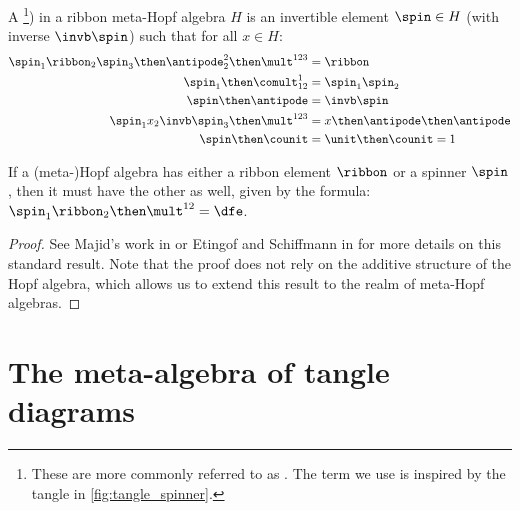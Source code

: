 \begin{definition}[spinner]
        A \footnote{%
                These are more commonly referred to as . The term we use is inspired by
                the tangle in \cref{fig:tangle_spinner}.
        }) in a ribbon meta-Hopf algebra $H$ is an invertible element
        $\spin\in H$ (with inverse $\invb\spin$) such that for all $x\in H$:
        \begin{align}
                \label{eq:spinner_ribbon}
                \spin_1\ribbon_2\spin_3 \then \antipode^2_2 \then \mult^{123} &=
                \ribbon\\
                \label{eq:spinner_comult}
                \spin_1\then\comult^{1}_{12} &=\spin_1\spin_2\\
                \label{eq:spinner_antipode}
                \spin \then\antipode &= \invb\spin\\
                \label{eq:spinner_conjugate}
                \spin_{1}x_2\invb\spin_{3}\then\mult^{123} &=
                x \then \antipode \then \antipode\\
                \label{eq:spinner_counit}
                \spin \then \counit &= \unit \then \counit = 1
        \end{align}
\end{definition}

\begin{lemma}\label{lem:spinner_ribbon}
        If a (meta-)Hopf algebra has either a ribbon element $\ribbon$ or a spinner
        $\spin$, then it must have the other as well, given by the formula:
        $\spin_1 \ribbon_2 \then \mult^{12} = \dfe$.
\end{lemma}
\begin{proof}
        See Majid's work in \cite{SM} or Etingof and Schiffmann in \cite{ES}
        for more details on this standard result. Note that the proof does not
        rely on the additive structure of the Hopf algebra, which allows us to
        extend this result to the realm of meta-Hopf algebras.
\end{proof}

\section{The meta-algebra of tangle diagrams}
\label{sec:topological_interpretations}

